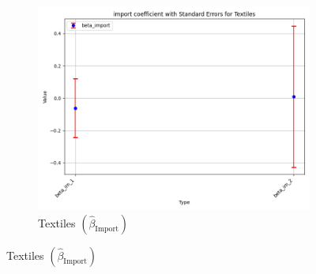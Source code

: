 \documentclass{article}
\begin{document}
\begin{figure}[ht!]
    \begin{subfigure}[t]{0.32\textwidth}
        \centering
        \includegraphics[width=\textwidth]{figure/empirical_stat_normal_kmshare_ciiu_beta_import_with_error_bars_Textiles.png}
        \caption{Textiles $(\hat{\beta}_{\text{Import}})$}
    \end{subfigure}
\end{figure}
\end{document}
